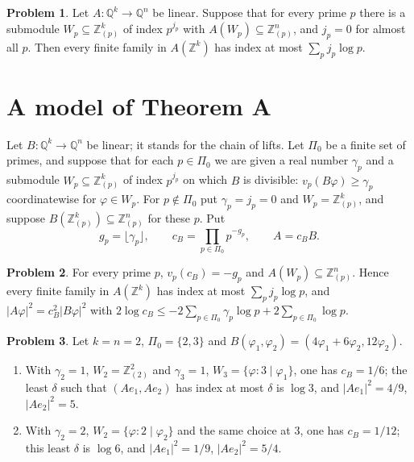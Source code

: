 \documentclass[reqno]{amsart}
\theoremstyle{definition}
\newtheorem{problem}{Problem}[section]
\theoremstyle{plain}
\theoremstyle{definition}
\newcommand{\Z}{\mathbb{Z}}
\newcommand{\Q}{\mathbb{Q}}
\newcommand{\Zp}{\Z_{(p)}}
\begin{document}
\begin{problem}\label{pr:colength-index}
Let \(A\colon \Q^k \to \Q^n\) be linear.  Suppose that for every prime \(p\) there is a submodule \(W_p \subseteq \Zp^k\) of index \(p^{j_p}\) with \(A(W_p) \subseteq \Zp^n\), and \(j_p = 0\) for almost all \(p\).  Then every finite family in \(A(\Z^k)\) has index at most \(\sum_p j_p\log p\).
\end{problem}

\section{A model of Theorem A}\label{sec:model}

Let \(B\colon \Q^k \to \Q^n\) be linear; it stands for the chain of lifts.  Let \(\Pi_0\) be a finite set of primes, and suppose that for each \(p \in \Pi_0\) we are given a real number \(\gamma_p\) and a submodule \(W_p \subseteq \Zp^k\) of index \(p^{j_p}\) on which \(B\) is divisible: \(v_p(B\varphi) \ge \gamma_p\) coordinatewise for \(\varphi \in W_p\).  For \(p \notin \Pi_0\) put \(\gamma_p = j_p = 0\) and \(W_p = \Zp^k\), and suppose \(B(\Zp^k) \subseteq \Zp^n\) for these \(p\).  Put
\[
  g_p = \lfloor \gamma_p \rfloor, \qquad c_B = \prod_{p \in \Pi_0} p^{-g_p}, \qquad A = c_B B .
\]

\begin{problem}\label{pr:cB-local}
For every prime \(p\), \(v_p(c_B) = -g_p\) and \(A(W_p) \subseteq \Zp^n\).  Hence every finite family in \(A(\Z^k)\) has index at most \(\sum_p j_p \log p\), and \(\lvert A\varphi\rvert^2 = c_B^2\lvert B\varphi\rvert^2\) with \(2\log c_B \le -2\sum_{p \in \Pi_0} \gamma_p\log p + 2\sum_{p \in \Pi_0}\log p\).
\end{problem}

\begin{problem}\label{pr:model}
Let \(k = n = 2\), \(\Pi_0 = \{2, 3\}\) and \(B(\varphi_1, \varphi_2) = (4\varphi_1 + 6\varphi_2, 12\varphi_2)\).
\begin{enumerate}
\item With \(\gamma_2 = 1\), \(W_2 = \Z_{(2)}^2\) and \(\gamma_3 = 1\), \(W_3 = \{\varphi : 3 \mid \varphi_1\}\), one has \(c_B = 1/6\); the least \(\delta\) such that \((Ae_1, Ae_2)\) has index at most \(\delta\) is \(\log 3\), and \(\lvert Ae_1\rvert^2 = 4/9\), \(\lvert Ae_2\rvert^2 = 5\).
\item With \(\gamma_2 = 2\), \(W_2 = \{\varphi : 2 \mid \varphi_2\}\) and the same choice at \(3\), one has \(c_B = 1/12\); this least \(\delta\) is \(\log 6\), and \(\lvert Ae_1\rvert^2 = 1/9\), \(\lvert Ae_2\rvert^2 = 5/4\).
\end{enumerate}
\end{problem}
\end{document}
